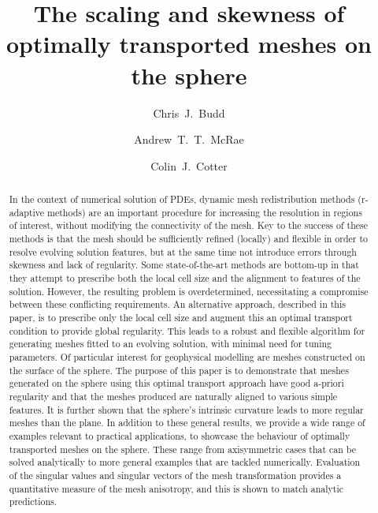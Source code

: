 \documentclass[11pt, a4paper]{scrartcl}  %
\theoremstyle{plain}
\theoremstyle{definition}
\numberwithin{equation}{section}
\begin{document}
\author[1,*]{Chris~J.~Budd}
\author[1,2]{Andrew~T.~T.~McRae}
\author[3]{Colin~J.~Cotter}
\title{The scaling and skewness of optimally transported meshes on the sphere}
\date{}
\maketitle

\begin{abstract}
  In the context of numerical solution of PDEs, dynamic mesh redistribution
  methods (r-adaptive methods) are an important procedure for increasing
  the resolution in regions of interest, without modifying the
  connectivity of the mesh. Key to the success of these methods is that
  the mesh should be sufficiently refined (locally) and flexible in
  order to resolve evolving solution features, but at the same time not
  introduce errors through skewness and lack of regularity. Some
  state-of-the-art methods are bottom-up in that they attempt to
  prescribe both the local cell size and the alignment to features of
  the solution. However, the resulting problem is overdetermined,
  necessitating a compromise between these conflicting requirements.
  An alternative approach, described in this paper, is to prescribe only
  the local cell size and augment this an optimal transport condition to
  provide global regularity. This leads to a robust and flexible
  algorithm for generating meshes fitted to an evolving solution, with minimal
  need for tuning parameters. Of particular interest for geophysical
  modelling are meshes constructed on the surface of the sphere. The
  purpose of this paper is to demonstrate that meshes generated on the
  sphere using this optimal transport approach have good a-priori 
  regularity and that the meshes produced are naturally aligned to
  various simple features. It is further shown that the sphere's
  intrinsic curvature leads to more regular meshes than the plane. In
  addition to these general results, we provide a wide range of examples
  relevant to practical applications, to showcase the behaviour of
  optimally transported meshes on the sphere. These range from
  axisymmetric cases that can be solved analytically to more general
  examples that are tackled numerically. Evaluation of the singular
  values and singular vectors of the mesh transformation provides a
  quantitative measure of the mesh anisotropy, and this is shown to
  match analytic predictions.
\end{abstract}
\end{document}
